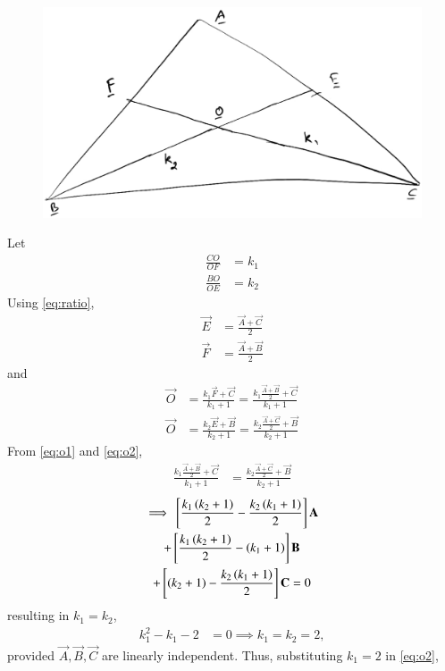 \documentclass[journal,12pt,twocolumn]{IEEEtran}
\renewcommand\thesection{\arabic{section}}
\begin{document}
\begin{enumerate}[label=\thesection.\arabic*
,ref=\thesection.\theenumi]
\begin{figure}[!hb]
\centering
\includegraphics[width=\columnwidth]{./figs/median.eps}
\caption{}
\label{fig:median}
\end{figure}
\solution Let
\begin{align}
\frac{CO}{OF} &= k_1
\\
\frac{BO}{OE} &= k_2
\end{align}
%
Using  \eqref{eq:ratio},
\begin{align}
\vec{E}&= \frac{\vec{A} + \vec{C}}{2}
\\
\vec{F}&= \frac{\vec{A} + \vec{B}}{2}
\end{align}
%
and
\begin{align}
\label{eq:o1}
\vec{O}&= \frac{k_1\vec{F} + \vec{C}}{k_1+1} = \frac{k_1\frac{\vec{A} + \vec{B}}{2} + \vec{C}}{k_1+1}
\\
\vec{O}&= \frac{k_2\vec{E} + \vec{B}}{k_2+1} = \frac{k_2\frac{\vec{A} + \vec{C}}{2} + \vec{B}}{k_2+1}
\label{eq:o2}
\end{align}
%
From \eqref{eq:o1} and \eqref{eq:o2},
\begin{align}
 \frac{k_1\frac{\vec{A} + \vec{B}}{2} + \vec{C}}{k_1+1} &= 
 \frac{k_2\frac{\vec{A} + \vec{C}}{2} + \vec{B}}{k_2+1}
\end{align}
\begin{multline}
\label{eq:lin_comb}
\implies {}\left[\frac{k_1\left(k_2+1\right)}{2}
-\frac{k_2\left(k_1+1\right)}{2}\right]\mathbf{A} 
\\
+ 
{}\left[\frac{k_1\left(k_2+1\right)}{2}-\left(k_1+1\right)\right]\mathbf{B} 
\\
+ {}\left[\left(k_2+1\right)-\frac{k_2\left(k_1+1\right)}{2}\right]\mathbf{C} 
= 0
\end{multline}
resulting in $k_1 = k_2$,
\begin{align}
k_1^2-k_1-2  &= 0
\implies k_1 = k_2 = 2,
\end{align}
provided $\vec{A},\vec{B},\vec{C}$ are linearly independent. Thus, substituting $k_1=2$ in \eqref{eq:o2},

\end{enumerate}
\end{document}
